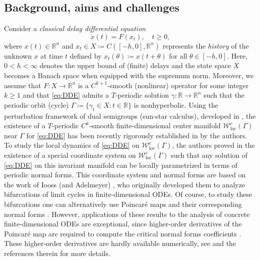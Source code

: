 \documentclass[english]{myarticle}
\DeclareMathOperator{\loc}{loc}
\begin{document}
\begin{sloppypar}
\subsection{Background, aims and challenges} \label{subsec:background}
Consider a {\it classical delay differential equation}
\begin{equation} \label{eq:DDE} \tag{DDE} 
    \dot{x}(t) = F(x_t), \quad t \geq 0,
\end{equation}
where $x(t) \in \mathbb{R}^n$ and $x_t \in X \coloneqq C([-h,0],\mathbb{R}^n)$ represents the \emph{history} of the unknown $x$ at time $t$ defined by $x_t(\theta) \coloneqq x(t+\theta)$ for all $\theta \in [-h,0]$. Here, $0 < h < \infty$ denotes the upper bound of (finite) delays and the state space $X$ becomes a Banach space when equipped with the supremum norm. Moreover, we assume that $F : X \to \mathbb{R}^n$ is a $C^{k+1}$-smooth (nonlinear) operator for some integer $k \geq 1$ and that \eqref{eq:DDE} admits a $T$-periodic solution $\gamma : \mathbb{R} \to \mathbb{R}^n$ such that the periodic orbit (cycle) $\Gamma \coloneqq \{ \gamma_t \in X : t \in \mathbb{R} \}$ is nonhyperbolic. Using the perturbation framework of dual semigroups (sun-star calculus), developed in \cite{Clement1988,Clement1987,Clement1989,Clement1989a,Diekmann1991}, the existence of a $T$-periodic $C^k$-smooth finite-dimensional center manifold $\mathcal{W}_{\loc}^c(\Gamma)$ near $\Gamma$ for \eqref{eq:DDE} has been recently rigorously established in \cite{Article1} by the authors. To study the local dynamics of \eqref{eq:DDE} on $\mathcal{W}_{\loc}^c(\Gamma)$, the authors proved in \cite{Article2} the existence of a special coordinate system on $\mathcal{W}_{\loc}^c(\Gamma)$ such that any solution of \eqref{eq:DDE} on this invariant manifold can be locally parametrized in terms of periodic normal forms. This coordinate system and normal forms are based on the work of Iooss (and Adelmeyer) \cite{Iooss1988,Iooss1999}, who originally developed them to analyze bifurcations of limit cycles in finite-dimensional ODEs. Of course, to study these bifurcations one can alternatively use Poincar\'e maps and their corresponding normal forms \cite{Diekmann1995,Guckenheimer1983,Kuznetsov2005,Szuecs2012}. However, applications of these results to the analysis of concrete finite-dimensional ODEs are exceptional, since higher-order derivatives of the Poincar\'e map are required to compute the critical normal forms coefficients \cite{Kuznetsov2023a,Kuznetsov2005}. These higher-order derivatives are hardly available numerically, see \cite{Witte2014,Witte2013} and the references therein for more details.


\end{sloppypar}
\end{document}
